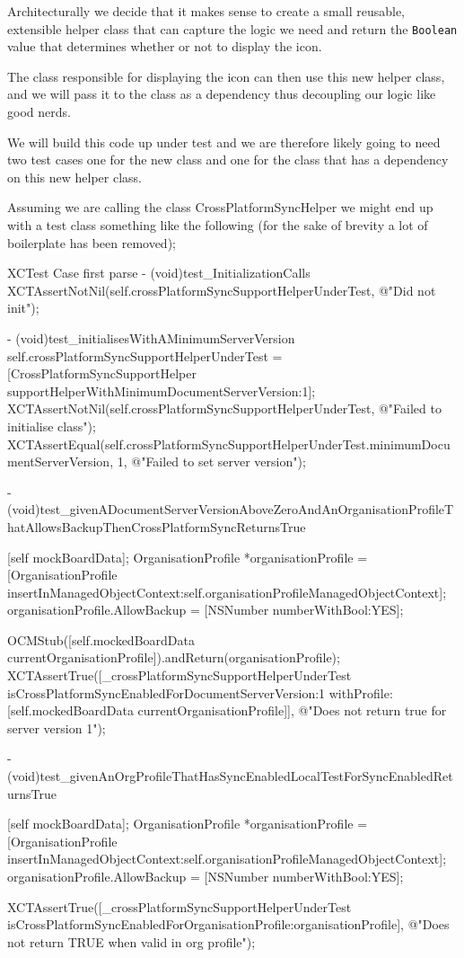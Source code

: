 \documentclass[a4paper, titlepage]{article}
\begin{document}
  Architecturally we decide that it makes sense to create a
  small reusable, extensible helper class that can capture the logic
  we need and return the \texttt{Boolean} value that determines whether or not to
  display the icon. 
  
  The class responsible for displaying the icon can
  then use this new helper class, and we will pass it to the class as a
  dependency thus decoupling our logic like good nerds.

  We will build this code up under test and we are therefore likely
  going to need two test cases one for the new class and one for the
  class that has a dependency on this new helper class.

  Assuming we are calling the class CrossPlatformSyncHelper we might
  end up with a test class something like the following (for the sake of
  brevity a lot of boilerplate has been removed);

  \begin{listbox}{1}{XCTest Case first parse}
      - (void)test_InitializationCalls
      {
          XCTAssertNotNil(self.crossPlatformSyncSupportHelperUnderTest, @"Did not init");
      }

      - (void)test_initialisesWithAMinimumServerVersion
      {
          self.crossPlatformSyncSupportHelperUnderTest = [CrossPlatformSyncSupportHelper supportHelperWithMinimumDocumentServerVersion:1];
          XCTAssertNotNil(self.crossPlatformSyncSupportHelperUnderTest, @"Failed to initialise class");
          XCTAssertEqual(self.crossPlatformSyncSupportHelperUnderTest.minimumDocumentServerVersion, 1, @"Failed to set server version");
      }

      - (void)test_givenADocumentServerVersionAboveZeroAndAnOrganisationProfileThatAllowsBackupThenCrossPlatformSyncReturnsTrue
      {
          [self mockBoardData];
          OrganisationProfile *organisationProfile = [OrganisationProfile insertInManagedObjectContext:self.organisationProfileManagedObjectContext];
          organisationProfile.AllowBackup = [NSNumber numberWithBool:YES];

          OCMStub([self.mockedBoardData currentOrganisationProfile]).andReturn(organisationProfile);
          XCTAssertTrue([_crossPlatformSyncSupportHelperUnderTest
          isCrossPlatformSyncEnabledForDocumentServerVersion:1
          withProfile: [self.mockedBoardData currentOrganisationProfile]], @"Does not return true for server version 1");
      }

      - (void)test_givenAnOrgProfileThatHasSyncEnabledLocalTestForSyncEnabledReturnsTrue
      {
          [self mockBoardData];
          OrganisationProfile *organisationProfile = [OrganisationProfile insertInManagedObjectContext:self.organisationProfileManagedObjectContext];
          organisationProfile.AllowBackup = [NSNumber numberWithBool:YES];

          XCTAssertTrue([_crossPlatformSyncSupportHelperUnderTest isCrossPlatformSyncEnabledForOrganisationProfile:organisationProfile], @"Does not return TRUE when valid in org profile");
      }
  \end{listbox}
\end{document}
